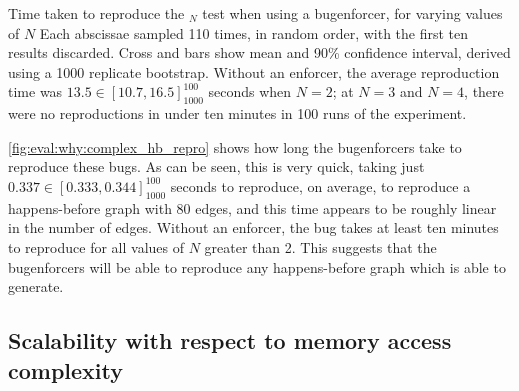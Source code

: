 \begin{sanefig}
  \caption{Time taken to reproduce the $_N$ test
    when using a \gls{bugenforcer}, for varying values of $N$ Each
    abscissae sampled 110 times, in random order, with the first ten
    results discarded.  Cross and bars show mean and 90\% confidence
    interval, derived using a 1000 replicate bootstrap.  Without an
    enforcer, the average reproduction time was $13.5 \in
    [10.7,16.5]_{1000}^{100}$ seconds when $N=2$; at $N=3$ and $N=4$,
    there were no reproductions in under ten minutes in 100 runs of
    the experiment.}
  \label{fig:eval:why:complex_hb_repro}
\end{sanefig}

\autoref{fig:eval:why:complex_hb_repro} shows how long the
\glspl{bugenforcer} take to reproduce these bugs.  As can be seen,
this is very quick, taking just $0.337 \in [0.333,0.344]_{1000}^{100}$
seconds to reproduce, on average, to reproduce a happens-before graph
with 80 edges, and this time appears to be roughly linear in the
number of edges.  Without an enforcer, the bug takes at least ten
minutes to reproduce for all values of $N$ greater than 2.  This
suggests that the \glspl{bugenforcer} will be able to reproduce any
happens-before graph which {\implementation} is able to generate.

\subsection{Scalability with respect to memory access complexity}

